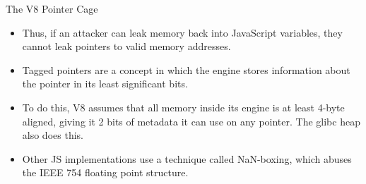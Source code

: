 \begin{frame}{The V8 Pointer Cage}
{\begin{itemize}
            \item Thus, if an attacker can leak memory back into JavaScript variables, they cannot leak pointers to valid memory addresses. 
            \item Tagged pointers are a concept in which the engine stores information about the pointer in its least significant bits.
            \item To do this, V8 assumes that all memory inside its engine is at least 4-byte aligned, giving it 2 bits of metadata it can use on any pointer. The glibc heap also does this.
            \item Other JS implementations use a technique called NaN-boxing, which abuses the IEEE 754 floating point structure.
        \end{itemize}
    }
\end{frame}